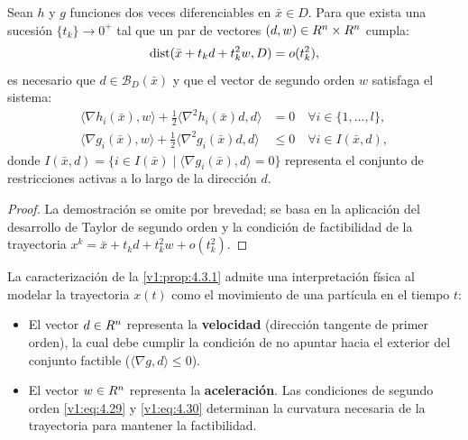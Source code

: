 \begin{proposition}\label{v1:prop:4.3.1}
 Sean $h$ y $g$ funciones dos veces diferenciables en $\bar{x} \in D$. Para que exista una sucesión $\{t_k\} \to 0^+$ tal que un par de vectores $(d, w) \in R^n \times R^n$ cumpla:
 \begin{equation}
 \operatorname{dist}(\bar{x} + t_k d + t_k^2 w, D) = o(t_k^2),
 \label{v1:eq:4.28}
 \end{equation}
 es necesario que $d \in \mathcal{B}_D(\bar{x})$ y que el vector de segundo orden $w$ satisfaga el sistema:
 \begin{align}
 \langle \nabla h_i(\bar{x}), w \rangle + \frac{1}{2} \langle \nabla^2 h_i(\bar{x}) d, d \rangle &= 0 \quad \forall i \in \{1,\dots,l\}, \label{v1:eq:4.29} \\
 \langle \nabla g_i(\bar{x}), w \rangle + \frac{1}{2} \langle \nabla^2 g_i(\bar{x}) d, d \rangle &\le 0 \quad \forall i \in I(\bar{x}, d), \label{v1:eq:4.30}
 \end{align}
 donde $I(\bar{x}, d) = \{ i \in I(\bar{x}) \mid \langle \nabla g_i(\bar{x}), d \rangle = 0 \}$ representa el conjunto de restricciones activas a lo largo de la dirección $d$.
\end{proposition}

\begin{proof}
 La demostración se omite por brevedad; se basa en la aplicación del desarrollo de Taylor de segundo orden y la condición de factibilidad de la trayectoria $x^k = \bar{x} + t_k d + t_k^2 w + o(t_k^2)$.
\end{proof}

\begin{notabox}
 La caracterización de la \cref{v1:prop:4.3.1} admite una interpretación física al modelar la trayectoria $x(t)$ como el movimiento de una partícula en el tiempo $t$:
 \begin{itemize}
 \item El vector $d \in R^n$ representa la \textbf{velocidad} (dirección tangente de primer orden), la cual debe cumplir la condición de no apuntar hacia el exterior del conjunto factible ($\langle \nabla g, d \rangle \le 0$).
 \item El vector $w \in R^n$ representa la \textbf{aceleración}. Las condiciones de segundo orden \eqref{v1:eq:4.29} y \eqref{v1:eq:4.30} determinan la curvatura necesaria de la trayectoria para mantener la factibilidad.
 \end{itemize}
\end{notabox}

